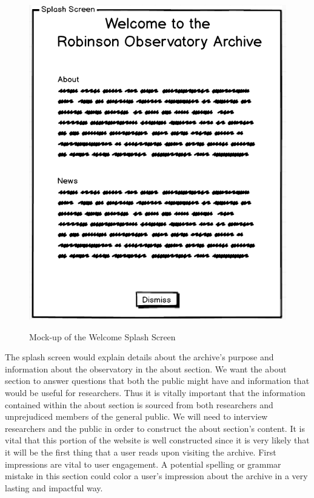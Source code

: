 \documentclass[12pt]{report}
\begin{document}
\begin{figure}[h]
	\centering
	\caption{Mock-up of the Welcome Splash Screen}
	\includegraphics[scale=0.5]{splash_screen_mockup}
	\label{fig:splashscreenmockup}
\end{figure}

The splash screen would explain details about the archive's purpose and information about the observatory in the about section. We want the about section to answer questions that both the public might have and information that would be useful for researchers. Thus it is vitally important that the information contained within the about section is sourced from both researchers and unprejudiced members of the general public. We will need to interview researchers and the public in order to construct the about section's content. It is vital that this portion of the website is well constructed since it is very likely that it will be the first thing that a user reads upon visiting the archive. First impressions are vital to user engagement. A potential spelling or grammar mistake in this section could color a user's impression about the archive in a very lasting and impactful way.
\end{document}
